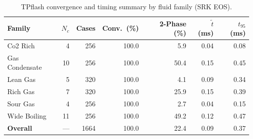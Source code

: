 \begin{table}[htbp]
\centering
\caption{TPflash convergence and timing summary by fluid family (SRK EOS).}
\label{tab:convergence-summary}
\begin{tabular}{lrrrrrr}
\hline
Family & $N_c$ & Cases & Conv.\ (\%) & 2-Phase (\%) & $\tilde{t}$ (ms) & $t_{95}$ (ms) \\
\hline
Co2 Rich & 4 & 256 & 100.0 & 5.9 & 0.04 & 0.08 \\
Gas Condensate & 10 & 256 & 100.0 & 50.4 & 0.15 & 0.45 \\
Lean Gas & 5 & 320 & 100.0 & 4.1 & 0.09 & 0.34 \\
Rich Gas & 7 & 320 & 100.0 & 25.9 & 0.15 & 0.39 \\
Sour Gas & 4 & 256 & 100.0 & 2.7 & 0.04 & 0.15 \\
Wide Boiling & 11 & 256 & 100.0 & 49.2 & 0.12 & 0.47 \\
\hline
\textbf{Overall} & --- & 1664 & 100.0 & 22.4 & 0.09 & 0.37 \\
\hline
\end{tabular}
\end{table}